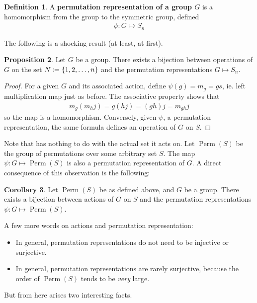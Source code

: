 \documentclass[11pt]{amsart} %
\theoremstyle{definition}
\newtheorem{definition}{Definition}[section]
\newtheorem{proposition}[definition]{Proposition}
\newtheorem{corollary}[definition]{Corollary}
\theoremstyle{definition}
\DeclareMathOperator{\perm}{Perm}
\numberwithin{equation}{section}
\begin{document}
\begin{definition}
	A \textbf{permutation representation of a group $G$} is a homomorphism from the group to the symmetric group, defined
	\begin{align*}
	\psi : G \mapsto S_n
	\end{align*}
\end{definition}

The following is a shocking result (at least, at first).

\begin{proposition}
	\label{propbijectionoperationsonsetandpermutationrepresentations}
	Let $G$ be a group. There exists a bijection between operations of $G$ on the set $N \coloneqq \set{1,2,\dots,n}$ and the permutation representations $G \mapsto S_n$.
\end{proposition}

\begin{proof}
	For a given $G$ and its associated action, define $\psi (g) = m_g = gs$, ie. left multiplication map just as before. The associative property shows that
	\begin{align*}
		m_g (m_h j) = g(h j) = (gh) j = m_{gh} j
	\end{align*}
	so the map is a homomorphism. Conversely, given $\psi$, a permutation representation, the same formula defines an operation of $G$ on $S$.
\end{proof}

Note that  has nothing to do with the actual set it acts on. Let $\perm(S)$ be the group of permutations over some arbitrary set $S$. The map $\psi : G \mapsto \perm (S)$ is also a permutation representation of $G$. A direct consequence of this observation is the following:

\begin{corollary}
	Let $\perm(S)$ be as defined above, and $G$ be a group. There exists a bijection between actions of $G$ on $S$ and the permutation representations $\psi:G \mapsto \perm(S)$.
\end{corollary}


A few more words on actions and permutation representation:
\begin{itemize}
	\item In general, permutation representations do not need to be injective or surjective.
	\item In general, permutation representations are rarely surjective, because the order of $\perm(S) $ tends to be \textit{very} large.
\end{itemize}
But from here arises two interesting facts.
\end{document}
